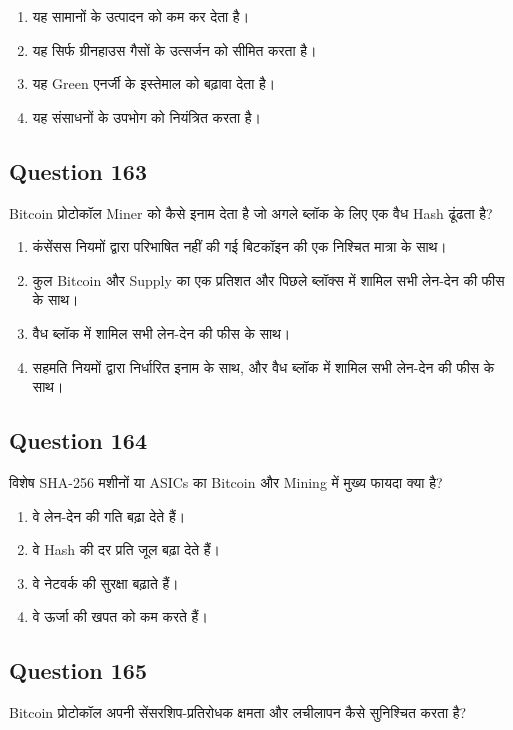 \documentclass[12pt,a4paper]{article}
\begin{document}
\begin{enumerate}[label=\Alph*., leftmargin=*]
\item यह सामानों के उत्पादन को कम कर देता है।
\item यह सिर्फ ग्रीनहाउस गैसों के उत्सर्जन को सीमित करता है।
\item यह Green एनर्जी के इस्तेमाल को बढ़ावा देता है।
\item यह संसाधनों के उपभोग को नियंत्रित करता है।
\end{enumerate}

\bigskip


\subsection*{Question 163}
Bitcoin प्रोटोकॉल Miner को कैसे इनाम देता है जो अगले ब्लॉक के लिए एक वैध Hash ढूंढता है?

\begin{enumerate}[label=\Alph*., leftmargin=*]
\item कंसेंसस नियमों द्वारा परिभाषित नहीं की गई बिटकॉइन की एक निश्चित मात्रा के साथ।
\item कुल Bitcoin और Supply का एक प्रतिशत और पिछले ब्लॉक्स में शामिल सभी लेन-देन की फीस के साथ।
\item वैध ब्लॉक में शामिल सभी लेन-देन की फीस के साथ।
\item सहमति नियमों द्वारा निर्धारित इनाम के साथ, और वैध ब्लॉक में शामिल सभी लेन-देन की फीस के साथ।
\end{enumerate}

\bigskip


\subsection*{Question 164}
विशेष SHA-256 मशीनों या ASICs का Bitcoin और Mining में मुख्य फायदा क्या है?

\begin{enumerate}[label=\Alph*., leftmargin=*]
\item वे लेन-देन की गति बढ़ा देते हैं।
\item वे Hash की दर प्रति जूल बढ़ा देते हैं।
\item वे नेटवर्क की सुरक्षा बढ़ाते हैं।
\item वे ऊर्जा की खपत को कम करते हैं।
\end{enumerate}

\bigskip


\subsection*{Question 165}
Bitcoin प्रोटोकॉल अपनी सेंसरशिप-प्रतिरोधक क्षमता और लचीलापन कैसे सुनिश्चित करता है?
\end{document}
